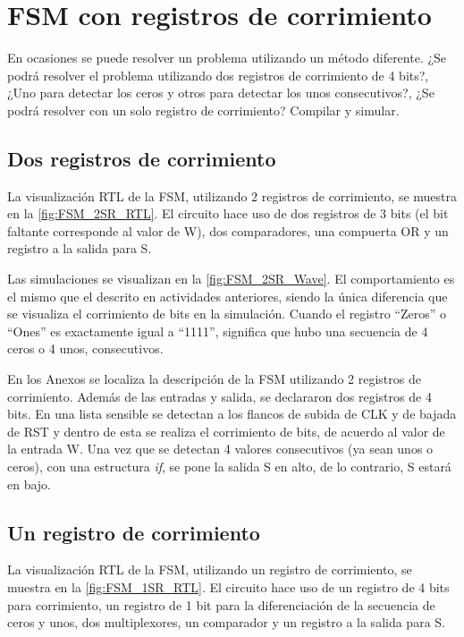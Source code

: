 \section{FSM con registros de corrimiento \label{sec:s5}}

\begin{center}
	\begin{minipage}{12cm}
		\begin{tcolorbox}[title=Actividad 5]
			En ocasiones se puede resolver un problema utilizando un método diferente. ¿Se podrá resolver el problema utilizando dos registros de corrimiento de 4 bits?, ¿Uno para detectar los ceros y otros para detectar los unos consecutivos?, ¿Se podrá resolver con un solo registro de corrimiento? Compilar y simular.
		\end{tcolorbox}	
	\end{minipage}
\end{center}

\subsection{Dos registros de corrimiento}
La visualización RTL de la FSM, utilizando 2 registros de corrimiento, se muestra en la \autoref{fig:FSM_2SR_RTL}. El circuito hace uso de dos registros de 3 bits (el bit faltante corresponde al valor de W), dos comparadores, una compuerta OR y un registro a la salida para S.

Las simulaciones se visualizan en la \autoref{fig:FSM_2SR_Wave}. El comportamiento es el mismo que el descrito en actividades anteriores, siendo la única diferencia que se visualiza el corrimiento de bits en la simulación. Cuando el registro ``Zeros'' o ``Ones'' es exactamente igual a ``1111'', significa que hubo una secuencia de 4 ceros o 4 unos, consecutivos.

En los Anexos se localiza la descripción de la FSM utilizando 2 registros de corrimiento. Además de las entradas y salida, se declararon dos registros de 4 bits. En una lista sensible se detectan a los flancos de subida de CLK y de bajada de RST y dentro de esta se realiza el corrimiento de bits, de acuerdo al valor de la entrada W. Una vez que se detectan 4 valores consecutivos (ya sean unos o ceros), con una estructura \textit{if}, se pone la salida S en alto, de lo contrario, S estará en bajo.

\subsection{Un registro de corrimiento}
La visualización RTL de la FSM, utilizando un registro de corrimiento, se muestra en la \autoref{fig:FSM_1SR_RTL}. El circuito hace uso de un registro de 4 bits para corrimiento, un registro de 1 bit para la diferenciación de la secuencia de ceros y unos, dos multiplexores, un comparador y un registro a la salida para S.

